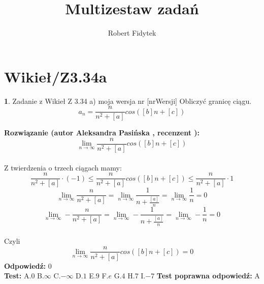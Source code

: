 \documentclass[12pt, a4paper]{article}
\title{Multizestaw zadań}
\author{Robert Fidytek}
\date{}
\theoremstyle{definition} %
\newtheorem{zad}{}
\newcommand{\kategoria}[1]{\section{#1}} %
\newcommand{\zadStart}[1]{\begin{zad}#1\newline} %
\newcommand{\zadStop}{\end{zad}}   %
\newcommand{\rozwStart}[2]{\noindent \textbf{Rozwiązanie (autor #1 , recenzent #2): }\newline} %
\newcommand{\rozwStop}{\newline}                                            %
\newcommand{\odpStart}{\noindent \textbf{Odpowiedź:}\newline}    %
\newcommand{\odpStop}{\newline}                                             %
\newcommand{\testStart}{\noindent \textbf{Test:}\newline} %
\newcommand{\testStop}{\newline} %
\newcommand{\kluczStart}{\noindent \textbf{Test poprawna odpowiedź:}\newline} %
\newcommand{\kluczStop}{\newline} %
\begin{document}
\maketitle


\kategoria{Wikieł/Z3.34a}
\zadStart{Zadanie z Wikieł Z 3.34 a) moja wersja nr [nrWersji]}
Obliczyć granicę ciągu. $$a_n=\frac{n}{n^2+[a]}cos([b]n+[c])$$
\zadStop
\rozwStart{Aleksandra Pasińska}{}
$$\lim_{n\rightarrow \infty}\frac{n}{n^2+[a]}cos([b]n+[c])$$\\
Z twierdzenia o trzech ciągach mamy:
$$\frac{n}{n^2+[a]}\cdot (-1) \leqslant \frac{n}{n^2+[a]}cos([b]n+[c]) \leqslant \frac{n}{n^2+[a]}\cdot 1$$
$$\lim_{n\rightarrow \infty}\frac{n}{n^2+[a]}=\lim_{n\rightarrow \infty}\frac{1}{n+\frac{[a]}{n}}=\lim_{n\rightarrow \infty}\frac{1}{n}=0$$
$$\lim_{n\rightarrow \infty}-\frac{n}{n^2+[a]}=\lim_{n\rightarrow \infty}-\frac{1}{n+\frac{[a]}{n}}=\lim_{n\rightarrow \infty}-\frac{1}{n}=0$$\\
Czyli $$\lim_{n\rightarrow \infty}\frac{n}{n^2+[a]}cos([b]n+[c])=0$$
\rozwStop
\odpStart
$0$\\
\odpStop
\testStart
A.$0$
B.$\infty$
C.$-\infty$
D.$1$
E.$9$
F.$e$
G.$4$
H.$7$
I.$-7$
\testStop
\kluczStart
A
\kluczStop
\end{document}
